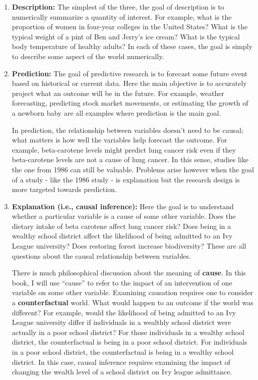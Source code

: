 \documentclass[
]{book}
\begin{document}
\begin{enumerate}
\def\labelenumi{\arabic{enumi}.}
\item
  \textbf{Description:} The simplest of the three, the goal of description is to numerically summarize a quantity of interest. For example, what is the proportion of women in four-year colleges in the United States? What is the typical weight of a pint of Ben and Jerry's ice cream? What is the typical body temperature of healthy adults? In each of these cases, the goal is simply to describe some aspect of the world numerically.
\item
  \textbf{Prediction:} The goal of predictive research is to forecast some future event based on historical or current data. Here the main objective is to accurately project what an outcome will be in the future. For example, weather forecasting, predicting stock market movements, or estimating the growth of a newborn baby are all examples where prediction is the main goal.

  In prediction, the relationship between variables doesn't need to be causal; what matters is how well the variables help forecast the outcome. For example, beta-carotene levels might predict lung cancer risk even if they beta-carotene levels are not a cause of lung cancer. In this sense, studies like the one from 1986 can still be valuable. Problems arise however when the goal of a study - like the 1986 study - is explanation but the research design is more targeted towards prediction.
\item
  \textbf{Explanation (i.e., causal inference):} Here the goal is to understand whether a particular variable is a cause of some other variable. Does the dietary intake of beta carotene affect lung cancer risk? Does being in a wealthy school district affect the likelihood of being admitted to an Ivy League university? Does restoring forest increase biodiversity? These are all questions about the causal relationship between variables.

  There is much philosophical discussion about the meaning of \textbf{cause}. In this book, I will use ``cause'' to refer to the impact of an intervention of one variable on some other variable. Examining causation requires one to consider a \textbf{counterfactual} world. What would happen to an outcome if the world was different? For example, would the likelihood of being admitted to an Ivy League university differ if individuals in a wealthly school district were actually in a poor school district? For those individuals in a wealthy school district, the counterfactual is being in a poor school district. For individuals in a poor school district, the counterfactual is being in a wealthy school district. In this case, causal inference requires examining the impact of changing the wealth level of a school district on Ivy league admittance.


\end{enumerate}
\end{document}
